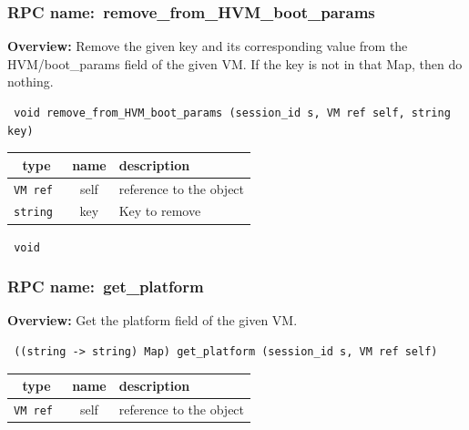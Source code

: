 \vspace{0.3cm}
\vspace{0.3cm}
\vspace{0.3cm}
\subsubsection{RPC name:~remove\_from\_HVM\_boot\_params}

{\bf Overview:} 
Remove the given key and its corresponding value from the HVM/boot\_params
field of the given VM.  If the key is not in that Map, then do nothing.

\begin{verbatim} void remove_from_HVM_boot_params (session_id s, VM ref self, string key)\end{verbatim}



 
\vspace{0.3cm}
\begin{tabular}{|c|c|p{7cm}|}
 \hline
{\bf type} & {\bf name} & {\bf description} \\ \hline
{\tt VM ref } & self & reference to the object \\ \hline 

{\tt string } & key & Key to remove \\ \hline 

\end{tabular}

\vspace{0.3cm}

{\tt 
void
}



\vspace{0.3cm}
\vspace{0.3cm}
\vspace{0.3cm}
\subsubsection{RPC name:~get\_platform}

{\bf Overview:} 
Get the platform field of the given VM.

\begin{verbatim} ((string -> string) Map) get_platform (session_id s, VM ref self)\end{verbatim}



 
\vspace{0.3cm}
\begin{tabular}{|c|c|p{7cm}|}
 \hline
{\bf type} & {\bf name} & {\bf description} \\ \hline
{\tt VM ref } & self & reference to the object \\ \hline 

\end{tabular}

